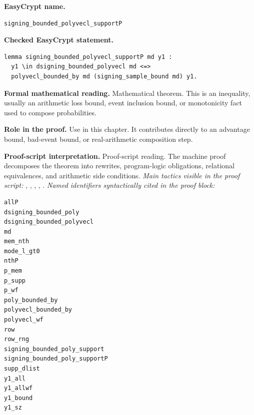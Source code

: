 \begin{formaltheorem}
\noindent\textbf{EasyCrypt name.}
\begin{lstlisting}[language=EasyCrypt,basicstyle=\ttfamily\scriptsize]
signing_bounded_polyvecl_supportP
\end{lstlisting}
\noindent\textbf{Checked EasyCrypt statement.}
\begin{lstlisting}[language=EasyCrypt,basicstyle=\ttfamily\scriptsize]
lemma signing_bounded_polyvecl_supportP md y1 :
  y1 \in dsigning_bounded_polyvecl md <=>
  polyvecl_bounded_by md (signing_sample_bound md) y1.
\end{lstlisting}
\noindent\textbf{Formal mathematical reading.}
Mathematical theorem. This is an inequality, usually an arithmetic loss bound, event inclusion bound, or monotonicity fact used to compose probabilities.

\noindent\textbf{Role in the proof.}
Use in this chapter. It contributes directly to an advantage bound, bad-event bound, or real-arithmetic composition step.

\noindent\textbf{Proof-script interpretation.}
Proof-script reading. The machine proof decomposes the theorem into rewrites, program-logic obligations, relational equivalences, and arithmetic side conditions.
\emph{Main tactics visible in the proof script:} , , , , .
\emph{Named identifiers syntactically cited in the proof block:}
\begin{lstlisting}[language=EasyCrypt,basicstyle=\ttfamily\scriptsize]
allP
dsigning_bounded_poly
dsigning_bounded_polyvecl
md
mem_nth
mode_l_gt0
nthP
p_mem
p_supp
p_wf
poly_bounded_by
polyvecl_bounded_by
polyvecl_wf
row
row_rng
signing_bounded_poly_support
signing_bounded_poly_supportP
supp_dlist
y1_all
y1_allwf
y1_bound
y1_sz
\end{lstlisting}

\end{formaltheorem}

